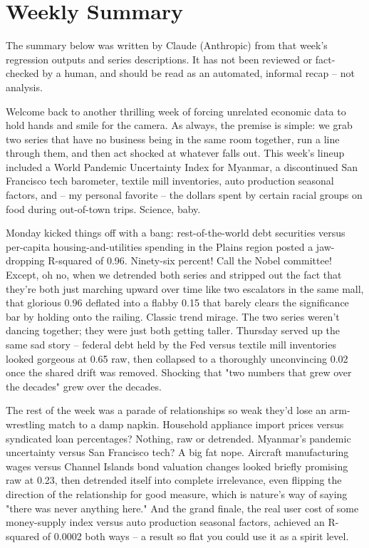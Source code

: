 \section{Weekly Summary}

\begin{tcolorbox}[colback=yellow!10,colframe=black!50,title=AI-Generated Content]
\noindent The summary below was written by Claude (Anthropic) from that week's regression outputs and series descriptions. It has not been reviewed or fact-checked by a human, and should be read as an automated, informal recap -- not analysis.
\end{tcolorbox}

Welcome back to another thrilling week of forcing unrelated economic data to hold hands and smile for the camera. As always, the premise is simple: we grab two series that have no business being in the same room together, run a line through them, and then act shocked at whatever falls out. This week's lineup included a World Pandemic Uncertainty Index for Myanmar, a discontinued San Francisco tech barometer, textile mill inventories, auto production seasonal factors, and -- my personal favorite -- the dollars spent by certain racial groups on food during out-of-town trips. Science, baby.

Monday kicked things off with a bang: rest-of-the-world debt securities versus per-capita housing-and-utilities spending in the Plains region posted a jaw-dropping R-squared of 0.96. Ninety-six percent! Call the Nobel committee! Except, oh no, when we detrended both series and stripped out the fact that they're both just marching upward over time like two escalators in the same mall, that glorious 0.96 deflated into a flabby 0.15 that barely clears the significance bar by holding onto the railing. Classic trend mirage. The two series weren't dancing together; they were just both getting taller. Thursday served up the same sad story -- federal debt held by the Fed versus textile mill inventories looked gorgeous at 0.65 raw, then collapsed to a thoroughly unconvincing 0.02 once the shared drift was removed. Shocking that "two numbers that grew over the decades" grew over the decades.

The rest of the week was a parade of relationships so weak they'd lose an arm-wrestling match to a damp napkin. Household appliance import prices versus syndicated loan percentages? Nothing, raw or detrended. Myanmar's pandemic uncertainty versus San Francisco tech? A big fat nope. Aircraft manufacturing wages versus Channel Islands bond valuation changes looked briefly promising raw at 0.23, then detrended itself into complete irrelevance, even flipping the direction of the relationship for good measure, which is nature's way of saying "there was never anything here." And the grand finale, the real user cost of some money-supply index versus auto production seasonal factors, achieved an R-squared of 0.0002 both ways -- a result so flat you could use it as a spirit level.

